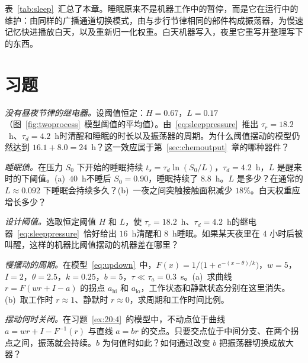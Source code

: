 表~\ref{tab:sleep}~汇总了本章。睡眠原来不是机器工作中的暂停，而是它在运行中的维护：由同样的广播通道切换模式，由与步行节律相同的部件构成振荡器，为慢速记忆快进播放白天，以及重新归一化权重。白天机器写入，夜里它重写并整理写下的东西。

\section{习题}

\begin{exercise}[\lvlA]
\label{ex:20:1}
\emph{没有昼夜节律的继电器。}设阈值恒定：$H=0.67$，$L=0.17$（图~\ref{fig:twoprocess}~模型阈值的平均值）。由~\eqref{eq:sleeppressure}~推出 $\tau_r=18.2$~h、$\tau_d=4.2$~h时清醒和睡眠的时长以及振荡器的周期。为什么阈值摆动的模型仍然达到 $16.1+8.0=24$~h？这一效应属于第~\ref{sec:chemoutput}~章的哪种器件？
\end{exercise}

\begin{exercise}[\lvlA]
\label{ex:20:2}
\emph{睡眠债。}在压力 $S_0$ 下开始的睡眠持续 $t_s=\tau_d\ln(S_0/L)$，$\tau_d=4.2$~h，$L$ 是醒来时的下阈值。(a)~$40$~h不睡后 $S_0=0.90$，睡眠持续了 $8.8$~h。$L$ 是多少？在通常的 $L\approx0.092$ 下睡眠会持续多久？(b)~一夜之间突触接触面积减少 $18\%$。白天权重应增长多少？
\end{exercise}

\begin{exercise}[\lvlB]
\label{ex:20:3}
\emph{设计阈值。}选取恒定阈值 $H$ 和 $L$，使 $\tau_r=18.2$~h、$\tau_d=4.2$~h的继电器~\eqref{eq:sleeppressure}~恰好给出 $16$~h清醒和 $8$~h睡眠。如果某天夜里在 $4$ 小时后被叫醒，这样的机器比阈值摆动的机器差在哪里？
\end{exercise}

\begin{exercise}[\lvlB]
\label{ex:20:4}
\emph{慢摆动的周期。}在模型~\eqref{eq:updown}~中，$F(x)=1/\bigl(1+e^{-(x-\theta)/k}\bigr)$，$w=5$，$I=2$，$\theta=2.5$，$k=0.25$，$b=5$，$\tau\ll\tau_a=0.3$~s。(a)~求曲线 $r=F(wr+I-a)$ 的拐点 $a_{\text{hi}}$ 和 $a_{\text{lo}}$，工作状态和静默状态分别在这里消失。(b)~取工作时 $r\approx1$、静默时 $r\approx0$，求周期和工作时间比例。
\end{exercise}

\begin{exercise}[\lvlB]
\label{ex:20:5}
\emph{摆动何时关闭。}在习题~\ref{ex:20:4}~的模型中，不动点位于曲线 $a=wr+I-F^{-1}(r)$ 与直线 $a=br$ 的交点。只要交点位于中间分支、在两个拐点之间，振荡就会持续。$b$ 为何值时如此？如何通过改变 $b$ 把振荡器切换成放大器？
\end{exercise}

